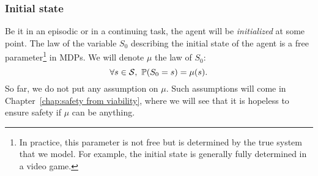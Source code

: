 		\subsubsection{Initial state} 
			Be it in an episodic or in a continuing task, the agent will be\emph{ initialized} at some point. The law of the variable $S_0$ describing the initial state of the agent is a free parameter\footnote{In practice, this parameter is not free but is determined by the true system that we model. For example, the initial state is generally fully determined in a video game.} in MDPs. We will denote $\mu$ the law of $S_0$:
			\begin{equation*}
				\forall s\in\S,~\P(S_0 = s) = \mu(s).
			\end{equation*}
			So far, we do not put any assumption on $\mu$. Such assumptions will come in Chapter~\ref{chap:safety from viability}, where we will see that it is hopeless to ensure safety if $\mu$ can be anything.
